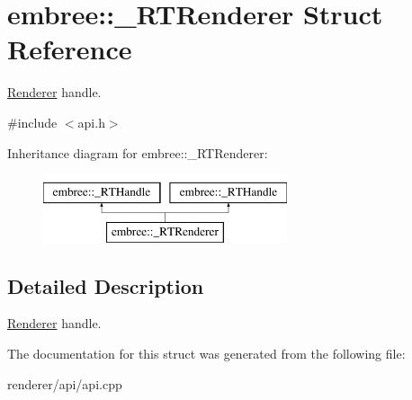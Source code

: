 \hypertarget{structembree_1_1___r_t_renderer}{
\section{embree::\_\-RTRenderer Struct Reference}
\label{structembree_1_1___r_t_renderer}
}


\hyperlink{classembree_1_1_renderer}{Renderer} handle.  




{\ttfamily \#include $<$api.h$>$}

Inheritance diagram for embree::\_\-RTRenderer:\begin{figure}[H]
\begin{center}
\leavevmode
\includegraphics[height=2.000000cm]{structembree_1_1___r_t_renderer}
\end{center}
\end{figure}


\subsection{Detailed Description}
\hyperlink{classembree_1_1_renderer}{Renderer} handle. 

The documentation for this struct was generated from the following file:\begin{DoxyCompactItemize}
\item 
renderer/api/api.cpp\end{DoxyCompactItemize}
